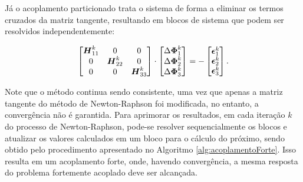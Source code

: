 Já o acoplamento particionado trata o sistema de forma a eliminar os termos cruzados da matriz tangente, resultando em blocos de sistema que podem ser resolvidos independentemente:

\begin{equation}
    \begin{bmatrix}
        \boldsymbol{H}_{11}^k & 0             & 0             \\
        0             & \boldsymbol{H}_{22}^k & 0             \\
        0             & 0             & \boldsymbol{H}_{33}^k
    \end{bmatrix}\cdot\begin{bmatrix}
        \Delta\boldsymbol{\Phi}_1^k \\\Delta\boldsymbol{\Phi}_2^k\\\Delta\boldsymbol{\Phi}_3^k
    \end{bmatrix}=-\begin{bmatrix}
        \boldsymbol{\epsilon}_1^k \\\boldsymbol{\epsilon}_2^k\\\boldsymbol{\epsilon}_3^k
    \end{bmatrix}\text{.}
\end{equation}

Note que o método continua sendo consistente, uma vez que apenas a matriz tangente do método de Newton-Raphson foi modificada, no entanto, a convergência não é garantida.
Para aprimorar os resultados, em cada iteração $k$ do processo de Newton-Raphson, pode-se resolver sequencialmente os blocos e atualizar os valores calculados em um bloco para o cálculo do próximo, sendo obtido pelo procedimento apresentado no Algoritmo \ref{alg:acoplamentoForte}. Isso resulta em um acoplamento forte, onde, havendo convergência, a mesma resposta do problema fortemente acoplado deve ser alcançada.


